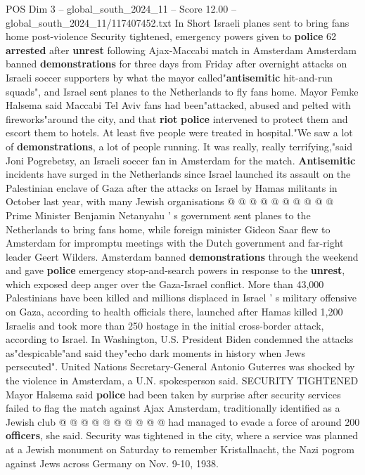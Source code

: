 \begin{textsample}{POS Dim 3 – global\_south\_2024\_11 – Score 12.00 – global\_south\_2024\_11/117407452.txt}  \label{ex:f3_pos_301}
In Short Israeli planes sent to bring fans home post-violence Security tightened, emergency powers given to \textbf{police} 62 \textbf{arrested} after \textbf{unrest} following Ajax-Maccabi match in Amsterdam Amsterdam banned \textbf{demonstrations} for three days from Friday after overnight attacks on Israeli soccer supporters by what the mayor called"\textbf{antisemitic} hit-and-run squads", and Israel sent planes to the Netherlands to fly fans home.
Mayor Femke Halsema said Maccabi Tel Aviv fans had been"attacked, abused and pelted with fireworks"around the city, and that \textbf{riot} \textbf{police} intervened to protect them and escort them to hotels.
At least five people were treated in hospital."We saw a lot of \textbf{demonstrations}, a lot of people running.
It was really, really terrifying,"said Joni Pogrebetsy, an Israeli soccer fan in Amsterdam for the match. \textbf{Antisemitic} incidents have surged in the Netherlands since Israel launched its assault on the Palestinian enclave of Gaza after the attacks on Israel by Hamas militants in October last year, with many Jewish organisations @ @ @ @ @ @ @ @ @ @ Prime Minister Benjamin Netanyahu ' s government sent planes to the Netherlands to bring fans home, while foreign minister Gideon Saar flew to Amsterdam for impromptu meetings with the Dutch government and far-right leader Geert Wilders.
Amsterdam banned \textbf{demonstrations} through the weekend and gave \textbf{police} emergency stop-and-search powers in response to the \textbf{unrest}, which exposed deep anger over the Gaza-Israel conflict.
More than 43,000 Palestinians have been killed and millions displaced in Israel ' s military offensive on Gaza, according to health officials there, launched after Hamas killed 1,200 Israelis and took more than 250 hostage in the initial cross-border attack, according to Israel.
In Washington, U.S.
President Biden condemned the attacks as"despicable"and said they"echo dark moments in history when Jews persecuted".
United Nations Secretary-General Antonio Guterres was shocked by the violence in Amsterdam, a U.N. spokesperson said.
SECURITY TIGHTENED Mayor Halsema said \textbf{police} had been taken by surprise after security services failed to flag the match against Ajax Amsterdam, traditionally identified as a Jewish club @ @ @ @ @ @ @ @ @ @ had managed to evade a force of around 200 \textbf{officers}, she said.
Security was tightened in the city, where a service was planned at a Jewish monument on Saturday to remember Kristallnacht, the Nazi pogrom against Jews across Germany on Nov. 9-10, 1938.

\end{textsample}
